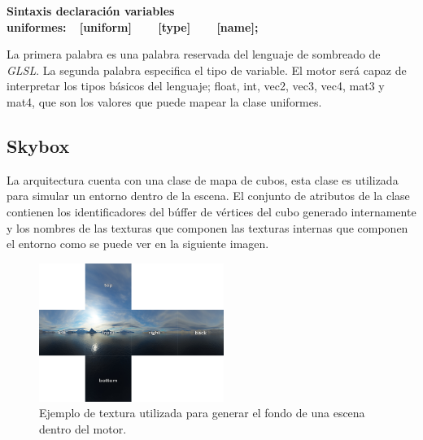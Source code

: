 \documentclass[a4paper]{book}
\begin{document}
\vspace{0.5cm}
\centerline{\textbf{Sintaxis declaración variables uniformes:\ \ [uniform]\ \ \ \ [type]\ \ \ \ [name];}}
\vspace{0.5cm}

La primera palabra es una palabra reservada del lenguaje de sombreado de \textit{GLSL}. La segunda palabra especifica el tipo de variable. El motor
será capaz de interpretar los tipos básicos del lenguaje; float, int, vec2, vec3, vec4, mat3 y mat4, que son los valores que puede mapear
la clase uniformes.

\subsection{Skybox}
\label{subsec:Skybox}

La arquitectura cuenta con una clase de mapa de cubos, esta clase es utilizada para simular un entorno dentro de la escena. El conjunto de
atributos de la clase contienen los identificadores del búffer de vértices del cubo generado internamente y los nombres de las texturas
que componen las texturas internas que componen el entorno como se puede ver en la siguiente imagen.

\begin{figure}[H]
    \centering
    \includegraphics[width=6cm, keepaspectratio]{img/cubemaps_skybox.png}
    \caption{Ejemplo de textura utilizada para generar el fondo de una escena dentro del motor.}
    \label{cubemaps_skybox}
\end{figure}
\end{document}
